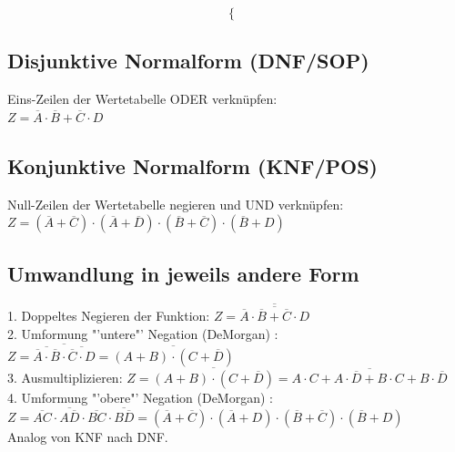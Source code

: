 \documentclass[6pt,a4paper]{scrartcl}
\newcommand{\ol}[1]{\ensuremath{\overline{#1}}}									%
\begin{document}
\begin{multicols}{3}
\begin{equation*}
\begin{cases}
	\end{cases}
	\end{equation*}



\subsection{Disjunktive Normalform (DNF/SOP)}
Eins-Zeilen der Wertetabelle ODER verknüpfen: \\
$Z = \overline A \cdot \overline B + \overline C \cdot D$

\subsection{Konjunktive Normalform (KNF/POS)}
Null-Zeilen der Wertetabelle negieren und UND verknüpfen: \\	
$Z = ( \ol A + \ol C) \cdot ( \ol A + \ol D) \cdot ( \ol B + \ol C) \cdot ( \ol B + D)$

\subsection{Umwandlung in jeweils andere Form}
1. Doppeltes Negieren der Funktion: $ Z = \overline {\overline{\overline A \cdot \overline B + \overline C \cdot D}}$\\
2. Umformung "'untere"'  Negation (DeMorgan) : $ Z = \ol{\ol{\ol A \cdot \ol B} \cdot \ol{\ol C \cdot D}} = \ol{(A+B) \cdot (C+\ol D)}$\\
3. Ausmultiplizieren: $ Z = \ol{(A+B) \cdot (C+\ol D)} = \ol{A\cdot C + A\cdot \ol D + B \cdot C + B \cdot \ol D}$\\
4. Umformung "'obere"'  Negation (DeMorgan) :\\ $ Z= \ol{AC} \cdot \ol{A \ol D} \cdot \ol{BC} \cdot \ol{B\ol D} = ( \ol A + \ol C) \cdot ( \ol A + D) \cdot ( \ol B + \ol C) \cdot ( \ol B + D)$\\
Analog von KNF nach DNF.

\end{multicols}
\end{document}
